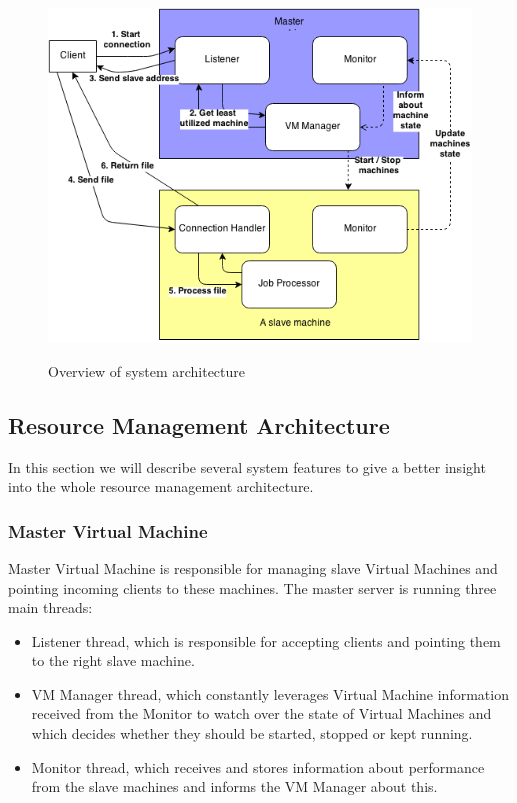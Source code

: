 \begin{figure}
\includegraphics[scale=0.5]{architecture}
\label{architecture}
\caption{Overview of system architecture}
\end{figure}


\subsection{Resource Management Architecture}

In this section we will describe several system features to give a better insight into the whole resource management architecture.

\subsubsection{Master Virtual Machine}
Master Virtual Machine is responsible for managing slave Virtual Machines and pointing incoming clients to these machines. The master server is running three main threads:
\begin{itemize}
 \item Listener thread, which is responsible for accepting clients and pointing them to the right slave machine.
 \item VM Manager thread, which constantly leverages Virtual Machine information received from the Monitor to watch over the state of Virtual Machines and which decides whether they should be started, stopped or kept running.
 \item Monitor thread, which receives and stores information about performance from the slave machines and informs the VM Manager about this.
\end{itemize}


